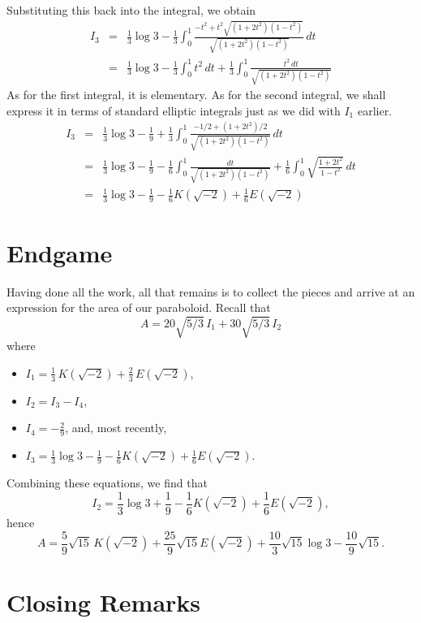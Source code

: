 \documentclass[12pt]{article}
\begin{document}
Substituting this back into the integral, we obtain
\begin{eqnarray*}
I_3 &=& \frac{1}{3} \log 3 - \frac{1}{3} \int_0^1 \frac{- t^2 + t^2 \sqrt{(1 + 2 t^2) (1 - t^2)}}{\sqrt{(1 + 2 t^2) (1 - t^2)}} \, dt \\
&=& \frac{1}{3} \log 3 - \frac{1}{3} \int_0^1 t^2 \, dt + \frac{1}{3} \int_0^1 \frac{t^2 \, dt}{\sqrt{(1 + 2 t^2) (1 - t^2)}} 
\end{eqnarray*}
As for the first integral, it is elementary.  As for the second integral, we shall express it in terms of standard elliptic integrals just as we did with $I_1$ earlier.
\begin{eqnarray*}
I_3 &=& \frac{1}{3} \log 3 - \frac{1}{9} + \frac{1}{3} \int_0^1 \frac{-1/2 + (1 + 2 t^2)/2}{\sqrt{(1 + 2 t^2) (1 - t^2)}} \, dt \\
&=& \frac{1}{3} \log 3 - \frac{1}{9} - \frac{1}{6} \int_0^1 \frac{dt}{\sqrt{(1 + 2 t^2) (1 - t^2)}} + \frac{1}{6} \int_0^1 \sqrt{\frac{1 + 2 t^2}{1 - t^2}} \, dt \\
 &=& \frac{1}{3} \log 3 - \frac{1}{9} - \frac{1}{6} K(\sqrt{-2}) + \frac{1}{6} E(\sqrt{-2})
\end{eqnarray*}

\section{Endgame}

Having done all the work, all that remains is to collect the pieces and arrive at an expression for the area of our paraboloid.  Recall that
 $$A = 20 \sqrt{5/3} \, I_1 + 30 \sqrt{5/3} \, I_2$$
where 
\begin{itemize}
\item $I_1 =  \frac{1}{3} \, K (\sqrt{-2}) + \frac{2}{3} \, E (\sqrt{-2})$,
\item $I_2 = I_3 - I_4$,
\item $I_4 = -\frac{2}{9}$, and, most recently,
\item $I_3 = \frac{1}{3} \log 3 - \frac{1}{9} - \frac{1}{6} K(\sqrt{-2}) + \frac{1}{6} E(\sqrt{-2})$.
\end{itemize}
Combining these equations, we find that
 $$I_2 = \frac{1}{3} \log 3 + \frac{1}{9} - \frac{1}{6} K(\sqrt{-2}) + \frac{1}{6} E(\sqrt{-2}),$$
hence
 $$A = \frac{5}{9} \sqrt{15} \, K (\sqrt{-2}) + \frac{25}{9} \sqrt{15} E (\sqrt{-2}) + \frac{10}{3} \sqrt{15} \log 3 - \frac{10}{9} \sqrt{15}.$$

\section{Closing Remarks}
\end{document}
